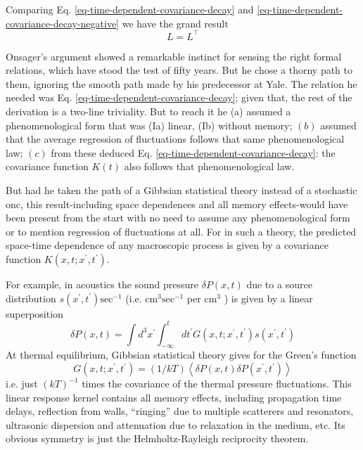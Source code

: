 \documentclass{article}
\begin{document}
Comparing Eq. \ref{eq-time-dependent-covariance-decay} and \ref{eq-time-dependent-covariance-decay-negative} we have the grand result
\begin{equation}
L=L^\top
\end{equation}

Onsager's argument showed a remarkable instinct for sensing the right formal relations, which have stood the test of fifty years. But he chose a thorny path to them, ignoring the smooth path made by his predecessor at Yale. The relation he needed was Eq. \ref{eq-time-dependent-covariance-decay}; given that, the rest of the derivation is a two-line triviality. But to reach it he (a) assumed a phenomenological form that was (Ia) linear, (Ib) without memory; $(b)$ assumed that the average regression of fluctuations follows that same phenomenological law; $(c)$ from these deduced Eq. \ref{eq-time-dependent-covariance-decay}: the covariance function $K(t)$ also follows that phenomenological law.

But had he taken the path of a Gibbsian statistical theory instead of a stochastic onc, this result-including space dependences and all memory effects-would have been present from the start with no need to assume any phenomenological form or to mention regression of fluctuations at all. For in such a theory, the predicted space-time dependence of any macroscopic process is given by a covariance function $K\left(x, t ; x^{\prime}, t^{\prime}\right)$.

For example, in acoustics the sound pressure $\delta P(x, t)$ due to a source distribution $s\left(x^{\prime}, t^{\prime}\right) \mathrm{sec}^{-1}$ (i.e. $\mathrm{cm}^3 \mathrm{sec}^{-1}$ per $\mathrm{cm}^3$ ) is given by a linear superposition
\begin{equation}
\delta P(x, t)=\int d^3 x^{\prime} \int_{-\infty}^t d t^{\prime} G\left(x, t ; x^{\prime}, t^{\prime}\right) s\left(x^{\prime}, t^{\prime}\right)
\end{equation}
At thermal equilibrium, Gibbsian statistical theory gives for the Green's function
\begin{equation}
G\left(x, t ; x^{\prime}, t^{\prime}\right)=(1 / k T)\left\langle\delta P(x, t) \delta P\left(x^{\prime}, t^{\prime}\right)\right\rangle \label{eq-greens-function}
\end{equation}
i.e. just $(k T)^{-1}$ times the covariance of the thermal pressure fluctuations. This linear response kernel contains all memory effects, including propagation time delays, reflection from walls, ``ringing'' due to multiple scatterers and resonators, ultrasonic dispersion and attenuation due to relaxation in the medium, etc. Its obvious symmetry is just the Helmholtz-Rayleigh reciprocity theorem.
\end{document}
